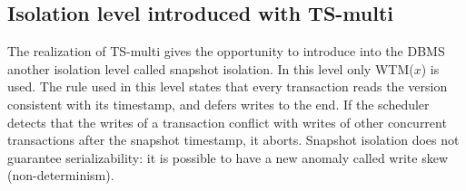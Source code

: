 \subsection*{Isolation level introduced with TS-multi}
The realization of TS-multi gives the opportunity to introduce into the DBMS another isolation level called snapshot isolation. In this level only WTM($x$) is used. The rule 
used in this level states that every transaction reads the version consistent with its timestamp, and defers writes to the end. If the scheduler detects that the writes of a
transaction conflict with writes of other concurrent transactions after the snapshot timestamp, it aborts. Snapshot isolation does not guarantee serializability: it is possible 
to have a new anomaly called write skew (non-determinism). 